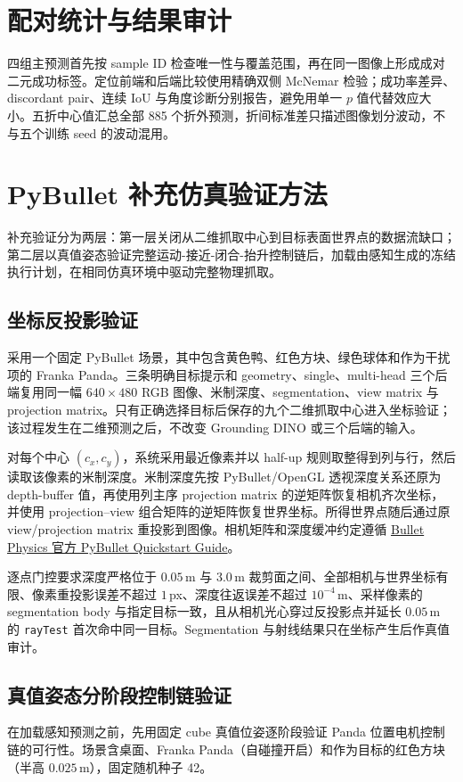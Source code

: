 \documentclass{l4proj}
\begin{document}
\section{配对统计与结果审计}
四组主预测首先按 sample ID 检查唯一性与覆盖范围，再在同一图像上形成成对二元成功标签。定位前端和后端比较使用精确双侧 McNemar 检验；成功率差异、discordant pair、连续 IoU 与角度诊断分别报告，避免用单一 $p$ 值代替效应大小。五折中心值汇总全部 885 个折外预测，折间标准差只描述图像划分波动，不与五个训练 seed 的波动混用。

\section{PyBullet 补充仿真验证方法}

补充验证分为两层：第一层关闭从二维抓取中心到目标表面世界点的数据流缺口；第二层以真值姿态验证完整运动-接近-闭合-抬升控制链后，加载由感知生成的冻结执行计划，在相同仿真环境中驱动完整物理抓取。

\subsection{坐标反投影验证}
采用一个固定 PyBullet 场景，其中包含黄色鸭、红色方块、绿色球体和作为干扰项的 Franka Panda。三条明确目标提示和 geometry、single、multi-head 三个后端复用同一幅 $640\times480$ RGB 图像、米制深度、segmentation、view matrix 与 projection matrix。只有正确选择目标后保存的九个二维抓取中心进入坐标验证；该过程发生在二维预测之后，不改变 Grounding DINO 或三个后端的输入。

对每个中心 $(c_x,c_y)$，系统采用最近像素并以 half-up 规则取整得到列与行，然后读取该像素的米制深度。米制深度先按 PyBullet/OpenGL 透视深度关系还原为 depth-buffer 值，再使用列主序 projection matrix 的逆矩阵恢复相机齐次坐标，并使用 projection--view 组合矩阵的逆矩阵恢复世界坐标。所得世界点随后通过原 view/projection matrix 重投影到图像。相机矩阵和深度缓冲约定遵循 \href{https://github.com/bulletphysics/bullet3/blob/master/docs/pybullet_quickstartguide.pdf}{Bullet Physics 官方 PyBullet Quickstart Guide}。

逐点门控要求深度严格位于 $0.05$\,m 与 $3.0$\,m 裁剪面之间、全部相机与世界坐标有限、像素重投影误差不超过 $1$\,px、深度往返误差不超过 $10^{-4}$\,m、采样像素的 segmentation body 与指定目标一致，且从相机光心穿过反投影点并延长 $0.05$\,m 的 \texttt{rayTest} 首次命中同一目标。Segmentation 与射线结果只在坐标产生后作真值审计。

\subsection{真值姿态分阶段控制链验证}
在加载感知预测之前，先用固定 cube 真值位姿逐阶段验证 Panda 位置电机控制链的可行性。场景含桌面、Franka Panda（自碰撞开启）和作为目标的红色方块（半高 $0.025$\,m），固定随机种子 42。
\end{document}
